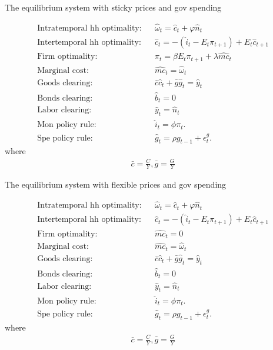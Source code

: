 \documentclass[9pt]{beamer}
\begin{document}
\begin{frame}{The equilibrium system with sticky prices and gov spending}

\begin{eqnarray}
\text{Intratemporal hh optimality:} && \hat \omega_t = \hat c_t + \varphi \hat n_t  \nonumber \\
\text{Intertemporal hh optimality:} && \hat c_t =  - (\hat i_t - E_t \pi_{t+1}) + E_t \hat c_{t+1}  \nonumber \\
\text{Firm optimality:} && \pi_t = \beta E_t \pi_{t+1} + \lambda \widehat{mc}_t \nonumber \\
\text{Marginal cost:} && \widehat{mc}_t = \hat \omega_t \nonumber \\
\text{Goods clearing:} && \bar c\hat c_t + \bar g \hat g_t = \hat y_t \nonumber \\
\text{Bonds clearing:} && \hat b_t = 0 \nonumber \\
\text{Labor clearing:} && \hat y_t = \hat n_t \nonumber \\
\text{Mon policy rule:} && \hat i_t = \phi \pi_t. \nonumber \\
\text{Spe policy rule:} && \hat g_t = \rho g_{t-1} + \epsilon^g_t. \nonumber 
\end{eqnarray}
where 
\begin{eqnarray}
\bar c = \frac{C}{Y}, \bar g = \frac{G}{Y} \nonumber
\end{eqnarray}

\end{frame}

\begin{frame}{The equilibrium system with flexible prices and gov spending}

\begin{eqnarray}
\text{Intratemporal hh optimality:} && \hat \omega_t = \hat c_t + \varphi \hat n_t  \nonumber \\
\text{Intertemporal hh optimality:} && \hat c_t =  - (\hat i_t - E_t \pi_{t+1}) + E_t \hat c_{t+1}  \nonumber \\
\text{Firm optimality:} &&  \widehat{mc}_t = 0 \nonumber \\
\text{Marginal cost:} && \widehat{mc}_t = \hat \omega_t \nonumber \\
\text{Goods clearing:} && \bar c\hat c_t + \bar g \hat g_t = \hat y_t \nonumber \\
\text{Bonds clearing:} && \hat b_t = 0 \nonumber \\
\text{Labor clearing:} && \hat y_t = \hat n_t \nonumber \\
\text{Mon policy rule:} && \hat i_t = \phi \pi_t. \nonumber \\
\text{Spe policy rule:} && \hat g_t = \rho g_{t-1} + \epsilon^g_t. \nonumber 
\end{eqnarray}
where 
\begin{eqnarray}
\bar c = \frac{C}{Y}, \bar g = \frac{G}{Y} \nonumber
\end{eqnarray}

\end{frame}
\end{document}
